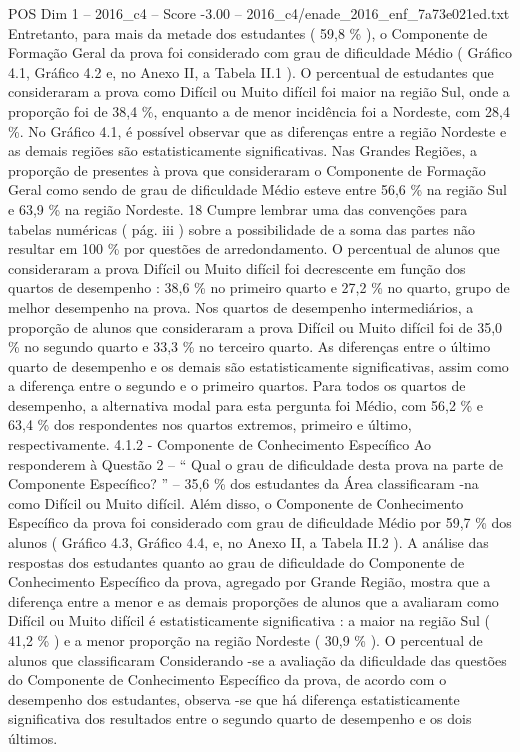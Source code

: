 \begin{textsample}{POS Dim 1 – 2016\_c4 – Score -3.00 – 2016\_c4/enade\_2016\_enf\_7a73e021ed.txt}
Entretanto, para mais da metade dos estudantes ( 59,8 \% ), o Componente de Formação Geral da prova foi considerado com grau de dificuldade Médio ( Gráfico 4.1, Gráfico 4.2 e, no Anexo II, a Tabela II.1 ).
O percentual de estudantes que consideraram a prova como Difícil ou Muito difícil foi maior na região Sul, onde a proporção foi de 38,4 \%, enquanto a de menor incidência foi a Nordeste, com 28,4 \%.
No Gráfico 4.1, é possível observar que as diferenças entre a região Nordeste e as demais regiões são estatisticamente significativas.
Nas Grandes Regiões, a proporção de presentes à prova que consideraram o Componente de Formação Geral como sendo de grau de dificuldade Médio esteve entre 56,6 \% na região Sul e 63,9 \% na região Nordeste. 18 Cumpre lembrar uma das convenções para tabelas numéricas ( pág. iii ) sobre a possibilidade de a soma das partes não resultar em 100 \% por questões de arredondamento.
O percentual de alunos que consideraram a prova Difícil ou Muito difícil foi decrescente em função dos quartos de desempenho : 38,6 \% no primeiro quarto e 27,2 \% no quarto, grupo de melhor desempenho na prova.
Nos quartos de desempenho intermediários, a proporção de alunos que consideraram a prova Difícil ou Muito difícil foi de 35,0 \% no segundo quarto e 33,3 \% no terceiro quarto.
As diferenças entre o último quarto de desempenho e os demais são estatisticamente significativas, assim como a diferença entre o segundo e o primeiro quartos.
Para todos os quartos de desempenho, a alternativa modal para esta pergunta foi Médio, com 56,2 \% e 63,4 \% dos respondentes nos quartos extremos, primeiro e último, respectivamente. 4.1.2 - Componente de Conhecimento Específico Ao responderem à Questão 2 – “ Qual o grau de dificuldade desta prova na parte de Componente Específico? ” – 35,6 \% dos estudantes da Área classificaram -na como Difícil ou Muito difícil.
Além disso, o Componente de Conhecimento Específico da prova foi considerado com grau de dificuldade Médio por 59,7 \% dos alunos ( Gráfico 4.3, Gráfico 4.4, e, no Anexo II, a Tabela II.2 ).
A análise das respostas dos estudantes quanto ao grau de dificuldade do Componente de Conhecimento Específico da prova, agregado por Grande Região, mostra que a diferença entre a menor e as demais proporções de alunos que a avaliaram como Difícil ou Muito difícil é estatisticamente significativa : a maior na região Sul ( 41,2 \% ) e a menor proporção na região Nordeste ( 30,9 \% ).
O percentual de alunos que classificaram Considerando -se a avaliação da dificuldade das questões do Componente de Conhecimento Específico da prova, de acordo com o desempenho dos estudantes, observa -se que há diferença estatisticamente significativa dos resultados entre o segundo quarto de desempenho e os dois últimos.

\end{textsample}
